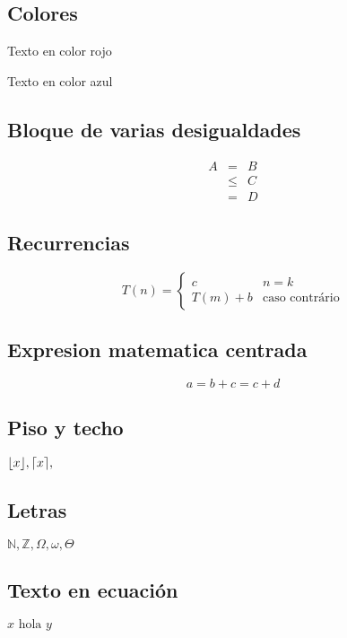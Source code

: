 \documentclass[12pt]{article}
\newcommand{\N}{\mathbb{N}}
\newcommand{\Z}{\mathbb{Z}}
\DeclarePairedDelimiter\ceil{\lceil}{\rceil}
\DeclarePairedDelimiter\floor{\lfloor}{\rfloor}
\begin{document}
\subsection*{Colores}


{
\color{red}
Texto en color rojo
}

{
\color{blue}
Texto en color azul
}

\subsection*{Bloque de varias desigualdades
}

\begin{eqnarray*}
A&=&B \\
&\leq& C \\
&=&D
\end{eqnarray*}

\subsection*{
Recurrencias
}

\begin{equation*}
T(n) =
\begin{cases}
c & n = k\\
T(m) + b & \text{caso contrário}
\end{cases}
\end{equation*}


\subsection*{Expresion matematica centrada
}

$$a=b+c=c+d$$

\subsection*{Piso y techo
}

$\floor*{x},
\ceil*{x},$

\subsection*{Letras}

$\N,\Z,\Omega,\omega,\Theta$

\subsection*{Texto en ecuación}

$x \mbox{ hola } y$
\end{document}
